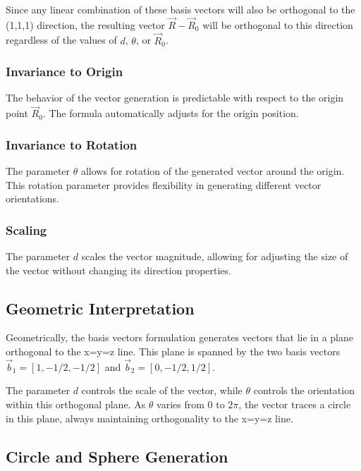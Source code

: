 Since any linear combination of these basis vectors will also be orthogonal to the (1,1,1) direction, the resulting vector $\vec{R} - \vec{R}_0$ will be orthogonal to this direction regardless of the values of $d$, $\theta$, or $\vec{R}_0$.

\subsubsection{Invariance to Origin}

The behavior of the vector generation is predictable with respect to the origin point $\vec{R}_0$. The formula automatically adjusts for the origin position.

\subsubsection{Invariance to Rotation}

The parameter $\theta$ allows for rotation of the generated vector around the origin. This rotation parameter provides flexibility in generating different vector orientations.

\subsubsection{Scaling}

The parameter $d$ scales the vector magnitude, allowing for adjusting the size of the vector without changing its direction properties.

\subsection{Geometric Interpretation}

Geometrically, the basis vectors formulation generates vectors that lie in a plane orthogonal to the x=y=z line. This plane is spanned by the two basis vectors $\vec{b}_1 = [1, -1/2, -1/2]$ and $\vec{b}_2 = [0, -1/2, 1/2]$.

The parameter $d$ controls the scale of the vector, while $\theta$ controls the orientation within this orthogonal plane. As $\theta$ varies from 0 to $2\pi$, the vector traces a circle in this plane, always maintaining orthogonality to the x=y=z line.

\subsection{Circle and Sphere Generation}

